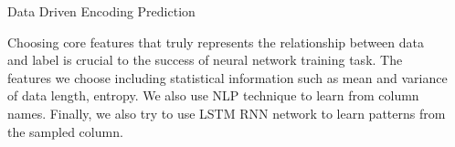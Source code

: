 \documentclass{beamer}
\newlength{\sepwid}
\newlength{\onecolwid}
\begin{document}
\begin{frame}[t]
\begin{columns}[t]
\begin{column}{\onecolwid}
\begin{block}{Data Driven Encoding Prediction}

Choosing core features that truly represents the relationship between data and
label is crucial to the success of neural network training task. The features
we choose including statistical information such as mean and variance of data
length, entropy. We also use NLP technique to learn from column names. Finally,
we also try to use LSTM RNN network to learn patterns from the sampled column.


\end{block}

\end{column}
\begin{column}{\sepwid}\end{column} %

\end{columns}

\end{frame}
\end{document}
